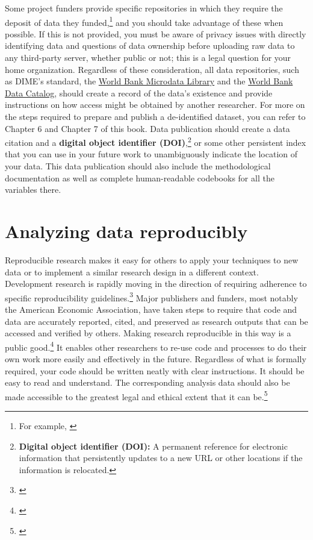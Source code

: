 \documentclass[]{tufte-book}
\begin{document}
Some project funders provide specific repositories in which they require
the deposit of data they funded,\footnote{For example,
  \href{https://data.usaid.gov}{}} and you should take advantage of
these when possible. If this is not provided, you must be aware of
privacy issues with directly identifying data and questions of data
ownership before uploading raw data to any third-party server, whether
public or not; this is a legal question for your
home organization. Regardless of these consideration, all data
repositories, such as DIME's standard, the
\href{https://microdata.worldbank.org}{World Bank Microdata Library} and
the \href{https:/datacatalog.worldbank.org}{World Bank Data Catalog},
should create a record of the data's existence and provide instructions
on how access might be obtained by another researcher. For more on the
steps required to prepare and publish a de-identified dataset, you can
refer to Chapter 6 and Chapter 7 of this book. Data publication should
create a data citation and a \textbf{digital object identifier
(DOI)},\footnote{\textbf{Digital object identifier (DOI):} A permanent
  reference for electronic information that persistently updates to a
  new URL or other locations if the information is relocated.}
or some other persistent index that you can use in your future work to
unambiguously indicate the location of your data. This data publication
should also include the methodological documentation as well as complete
human-readable codebooks for all the variables there.

\hypertarget{analyzing-data-reproducibly}{%
\section*{Analyzing data
reproducibly}\label{analyzing-data-reproducibly}}

Reproducible research makes it easy for others to apply your techniques
to new data or to implement a similar research design in a different
context. Development research is rapidly moving in the direction of
requiring adherence to specific reproducibility guidelines.\footnote{\cite{@christensen2018transparency}}
Major publishers and funders, most notably the American Economic
Association, have taken steps to require that code and data are
accurately reported, cited, and preserved as research outputs that can
be accessed and verified by others. Making research reproducible in this
way is a public good.\footnote{\href{https://dimewiki.worldbank.org/Reproducible_Research}{}}
It enables other researchers to re-use code and processes to do their
own work more easily and effectively in the future. Regardless of what
is formally required, your code should be written neatly with clear
instructions. It should be easy to read and understand. The
corresponding analysis data should also be made accessible to the
greatest legal and ethical extent that it can be.\footnote{\href{https://dimewiki.worldbank.org/Publishing_Data}{}}
\end{document}
